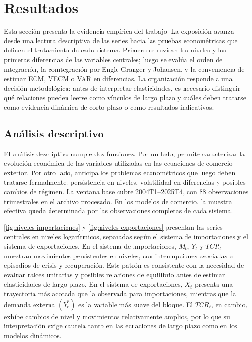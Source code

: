 \documentclass[11pt,a4paper]{article}
\begin{document}
	\section{Resultados}
	\label{sec:resultados}
	
	Esta sección presenta la evidencia empírica del trabajo. La exposición avanza
	desde una lectura descriptiva de las series hacia las pruebas econométricas que
	definen el tratamiento de cada sistema. Primero se revisan los niveles y las
	primeras diferencias de las variables centrales; luego se evalúa el orden de
	integración, la cointegración por Engle-Granger y Johansen, y la conveniencia
	de estimar ECM, VECM o VAR en diferencias. La organización responde a una
	decisión metodológica: antes de interpretar elasticidades, es necesario
	distinguir qué relaciones pueden leerse como vínculos de largo plazo y cuáles
	deben tratarse como evidencia dinámica de corto plazo o como resultados
	indicativos.
	
	\subsection{Análisis descriptivo}
	\label{subsec:analisis-descriptivo}
	
	El análisis descriptivo cumple dos funciones. Por un lado, permite caracterizar
	la evolución económica de las variables utilizadas en las ecuaciones de comercio
	exterior. Por otro lado, anticipa los problemas econométricos que luego deben
	tratarse formalmente: persistencia en niveles, volatilidad en diferencias y
	posibles cambios de régimen. La ventana base cubre 2004T1--2025T4, con 88
	observaciones trimestrales en el archivo procesado. En los modelos de comercio,
	la muestra efectiva queda determinada por las observaciones completas de cada
	sistema.
	
	\autoref{fig:niveles-importaciones} y \autoref{fig:niveles-exportaciones}
	presentan las series centrales en niveles logarítmicos, separadas según el
	sistema de importaciones y el sistema de exportaciones. En el sistema de
	importaciones, \(M_t\), \(Y_t\) y \(TCR_t\) muestran movimientos persistentes
	en niveles, con interrupciones asociadas a episodios de crisis y recuperación.
	Este patrón es consistente con la necesidad de evaluar raíces unitarias y
	posibles relaciones de equilibrio antes de estimar elasticidades de largo
	plazo. En el sistema de exportaciones, \(X_t\) presenta una trayectoria más
	acotada que la observada para importaciones, mientras que la demanda externa
	\((Y_t^*)\) es la variable más suave del bloque. El \(TCR_t\), en cambio,
	exhibe cambios de nivel y movimientos relativamente amplios, por lo que su
	interpretación exige cautela tanto en las ecuaciones de largo plazo como en los
	modelos dinámicos.
	
\end{document}
